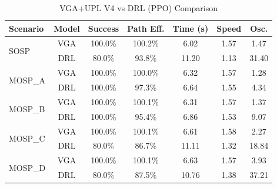 \begin{table}[htbp]
\centering
\caption{VGA+UPL V4 vs DRL (PPO) Comparison}
\begin{tabular}{|l|c|c|c|c|c|c|}
\hline
\textbf{Scenario} & \textbf{Model} & \textbf{Success} & \textbf{Path Eff.} & \textbf{Time (s)} & \textbf{Speed} & \textbf{Osc.} \\
\hline
\multirow{2}{*}{SOSP} & VGA & 100.0\% & 100.2\% & 6.02 & 1.57 & 1.47 \\
 & DRL & 80.0\% & 93.8\% & 11.20 & 1.13 & 31.40 \\
\hline
\multirow{2}{*}{MOSP_A} & VGA & 100.0\% & 100.0\% & 6.32 & 1.57 & 1.28 \\
 & DRL & 100.0\% & 97.3\% & 6.64 & 1.55 & 4.34 \\
\hline
\multirow{2}{*}{MOSP_B} & VGA & 100.0\% & 100.1\% & 6.31 & 1.57 & 1.37 \\
 & DRL & 100.0\% & 95.4\% & 6.86 & 1.53 & 9.07 \\
\hline
\multirow{2}{*}{MOSP_C} & VGA & 100.0\% & 100.1\% & 6.61 & 1.58 & 2.27 \\
 & DRL & 80.0\% & 86.7\% & 11.11 & 1.32 & 18.84 \\
\hline
\multirow{2}{*}{MOSP_D} & VGA & 100.0\% & 100.1\% & 6.63 & 1.57 & 3.93 \\
 & DRL & 80.0\% & 87.5\% & 10.76 & 1.38 & 37.21 \\
\hline
\end{tabular}
\end{table}